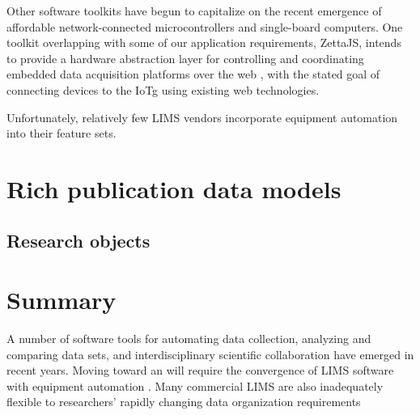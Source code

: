 \documentclass[../thesis]{subfiles}
\begin{document}
Other software toolkits have begun to capitalize on
the recent emergence of affordable network-connected microcontrollers
and single-board computers. One toolkit overlapping with some
of our application requirements, ZettaJS, intends to provide a
hardware abstraction layer for controlling and coordinating embedded
data acquisition platforms over the web \cite{ZettaJS}, with the
stated goal of connecting devices to the \gls{IoTg} using existing web
technologies.


Unfortunately, relatively few \gls{LIMS} vendors incorporate equipment
automation into their feature sets.



\section{Rich publication data models}

\subsection{Research objects}







\section{Summary}

A number of software tools for automating data collection, analyzing
and comparing data sets, and interdisciplinary scientific
collaboration have emerged in recent years. Moving toward an    will
require the convergence of \gls{LIMS} software with equipment automation .
Many commercial \gls{LIMS} are also inadequately flexible to researchers'
rapidly changing data organization requirements
\end{document}
